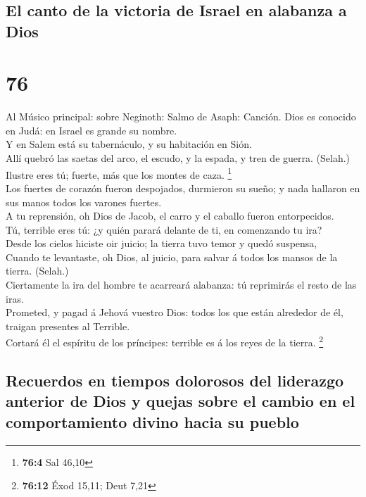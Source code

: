 \hypertarget{el-canto-de-la-victoria-de-israel-en-alabanza-a-dios}{%
\subsection{El canto de la victoria de Israel en alabanza a
Dios}\label{el-canto-de-la-victoria-de-israel-en-alabanza-a-dios}}

\hypertarget{section-75}{%
\section{76}\label{section-75}}

 Al Músico principal: sobre Neginoth: Salmo de Asaph:
Canción. Dios es conocido en Judá: en Israel es grande su nombre.\\
 Y en Salem está su tabernáculo, y su habitación en Sión.\\
 Allí quebró las saetas del arco, el escudo, y la espada, y
tren de guerra. (Selah.)\\
 Ilustre eres tú; fuerte, más que los montes de caza.
\footnote{\textbf{76:4} Sal 46,10}\\
 Los fuertes de corazón fueron despojados, durmieron su
sueño; y nada hallaron en sus manos todos los varones fuertes.\\
 A tu reprensión, oh Dios de Jacob, el carro y el caballo
fueron entorpecidos.\\
 Tú, terrible eres tú: ¿y quién parará delante de ti, en
comenzando tu ira?\\
 Desde los cielos hiciste oir juicio; la tierra tuvo temor y
quedó suspensa,\\
 Cuando te levantaste, oh Dios, al juicio, para salvar á
todos los mansos de la tierra. (Selah.)\\
 Ciertamente la ira del hombre te acarreará alabanza: tú
reprimirás el resto de las iras.\\
 Prometed, y pagad á Jehová vuestro Dios: todos los que
están alrededor de él, traigan presentes al Terrible.\\
 Cortará él el espíritu de los príncipes: terrible es á los
reyes de la tierra. \footnote{\textbf{76:12} Éxod 15,11; Deut 7,21}

\hypertarget{recuerdos-en-tiempos-dolorosos-del-liderazgo-anterior-de-dios-y-quejas-sobre-el-cambio-en-el-comportamiento-divino-hacia-su-pueblo}{%
\subsection{Recuerdos en tiempos dolorosos del liderazgo anterior de
Dios y quejas sobre el cambio en el comportamiento divino hacia su
pueblo}\label{recuerdos-en-tiempos-dolorosos-del-liderazgo-anterior-de-dios-y-quejas-sobre-el-cambio-en-el-comportamiento-divino-hacia-su-pueblo}}

